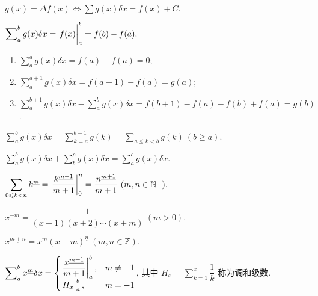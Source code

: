 \begin{definition}[不定和]
    $\displaystyle g(x)=\varDelta f(x)\iff \sum g(x)\delta x=f(x)+C.$
\end{definition}

\begin{definition}[定和]
    $\displaystyle \sum\nolimits_{a}^{b} g(x)\delta x=\eval{f(x)}_{a}^{b}=f(b)-f(a).$
\end{definition}

\begin{enumerate}[label=(\arabic{*})]
    \item $\displaystyle \sum\nolimits_a^a g(x)\delta x=f(a)-f(a)=0$;
    \item $\displaystyle \sum\nolimits_a^{a+1} g(x)\delta x=f(a+1)-f(a)=g(a)$;
    \item $\displaystyle \sum\nolimits_{a}^{b+1}g(x)\delta x-\sum\nolimits_{a}^{b}g(x)\delta x=f(b+1)-f(a)-f(b)+f(a)=g(b)$.
\end{enumerate}

\begin{theorem}
    $\displaystyle \sum\nolimits_{a}^{b}g(x)\delta x=\sum_{k=a}^{b-1}g(k)=\sum_{a\leqslant k<b}g(k)~(b\geqslant a).$
\end{theorem}

\begin{theorem}
    $\displaystyle \sum\nolimits_{a}^{b}g(x)\delta x+\sum\nolimits_b^c g(x)\delta x=\sum\nolimits_a^cg(x)\delta x.$
\end{theorem}

\begin{theorem}
    $\displaystyle \sum_{0\leqslant k<n}k^{\underline{m}}=\eval{\dfrac{k^{\underline{m+1}}}{m+1}}_{0}^{n}=\dfrac{n^{\underline{m+1}}}{m+1}~(m,n\in\mathbb{N}_+).$
\end{theorem}

\begin{definition}
    $x^{\underline{-m}}=\dfrac{1}{(x+1)(x+2)\cdots(x+m)}~(m>0).$
\end{definition}

\begin{theorem}
    $x^{\underline{m+n}}=x^{\underline{m}}(x-m)^{\underline{n}} ~(m,n\in\mathbb{Z}).$
\end{theorem}

\begin{theorem}
    $\displaystyle\sum\nolimits_a^b x^{\underline{m}}\delta x=\begin{cases}
            \eval{\dfrac{x^{\underline{m+1}}}{m+1}}_{a}^{b}, & m\neq -1 \\
            \eval{H_x}_{a}^{b},                              & m=-1
        \end{cases}$,
    其中 $\displaystyle H_x=\sum_{k=1}^{x}\dfrac{1}{k}$ 称为调和级数.
\end{theorem}

